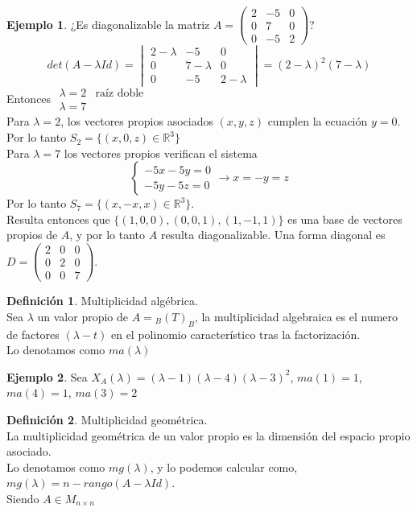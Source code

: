 \documentclass[10pt]{article}
\theoremstyle{definition}
\newtheorem{definition}{Definición}[section]
\newtheorem{example}{Ejemplo}[section]
\begin{document}
\begin{example}
	¿Es diagonalizable la matriz $A=\begin{pmatrix} 2&-5&0\\0&7&0\\0&-5&2 \end{pmatrix} $?
	$$det(A-\lambda Id)=\begin{vmatrix}
			2-\lambda & -5        & 0         \\
			0         & 7-\lambda & 0         \\
			0         & -5        & 2-\lambda
		\end{vmatrix} =( 2-\lambda )^{2}( 7-\lambda )$$
	Entonces $\begin{matrix}
			\lambda =2 & \text{raíz doble} \\
			\lambda =7 &
		\end{matrix}$
	\\Para $\lambda =2$, los vectores propios asociados $(x,y,z)$ cumplen la ecuación $y=0$.\\
	Por lo tanto $S_2=\{(x,0,z)\in\mathbb{R}^3\}$\\
	Para $\lambda=7$ los vectores propios verifican el sistema $$\begin{cases}
			-5x-5y=0 \\
			-5y-5z=0
		\end{cases}\rightarrow x=-y=z$$
	Por lo tanto $S_7=\{\left( x,-x,x \right)\in\mathbb{R}^3 \}$.
	\\Resulta entonces que $\{(1,0,0),(0,0,1),(1,-1,1)\}$ es una base de vectores propios de $A$, y por lo tanto $A$ resulta diagonalizable. Una forma diagonal es $D=\begin{pmatrix} 2&0&0\\0&2&0\\0&0&7 \end{pmatrix} $.
\end{example}
\begin{definition}{Multiplicidad algébrica.}
	\\Sea $\lambda$ un valor propio de $A={}_B(T)_B$, la multiplicidad algebraica es el numero de factores $(\lambda-t)$ en el polinomio característico tras la factorización.
	\\Lo denotamos como $ma(\lambda)$
\end{definition}
\begin{example}
	Sea $X_A(\lambda)=(\lambda -1)(\lambda -4)(\lambda -3)^2$, $ma(1)=1$, $ma(4)=1$, $ma(3)=2$
\end{example}
\begin{definition}{Multiplicidad geométrica.}
	\\La multiplicidad geométrica de un valor propio es la dimensión del espacio propio asociado.\\
	Lo denotamos como $mg(\lambda)$, y lo podemos calcular como, $mg(\lambda)=n-rango(A-\lambda Id)$.
	\\Siendo $A\in M_{n\times n}$
\end{definition}
\end{document}
